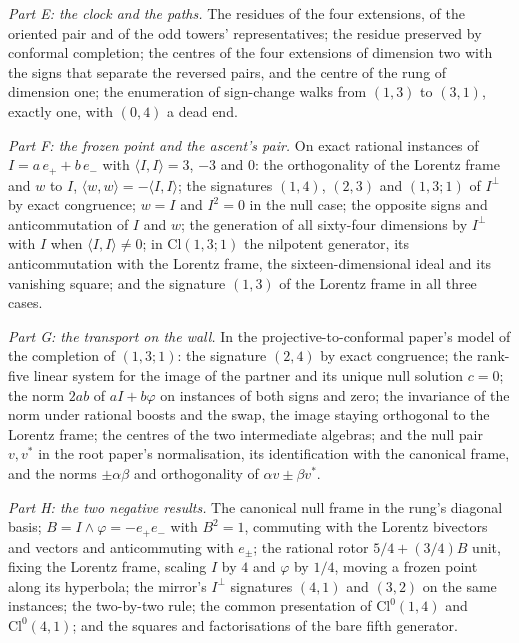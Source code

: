 \documentclass[11pt]{article}
\theoremstyle{definition}
\newcommand{\Cl}{\mathrm{Cl}}
\newcommand{\ip}[2]{\langle #1, #2\rangle}
\begin{document}
\emph{Part E: the clock and the paths.} The residues of the four extensions, of the oriented pair and of the odd towers' representatives; the residue preserved by conformal completion; the centres of the four extensions of dimension two with the signs that separate the reversed pairs, and the centre of the rung of dimension one; the enumeration of sign-change walks from $(1,3)$ to $(3,1)$, exactly one, with $(0,4)$ a dead end.

\emph{Part F: the frozen point and the ascent's pair.} On exact rational instances of $I = a\,e_{+} + b\,e_{-}$ with $\ip{I}{I} = 3$, $-3$ and $0$: the orthogonality of the Lorentz frame and $w$ to $I$, $\ip{w}{w} = -\ip{I}{I}$; the signatures $(1,4)$, $(2,3)$ and $(1,3;1)$ of $I^{\perp}$ by exact congruence; $w = I$ and $I^{2} = 0$ in the null case; the opposite signs and anticommutation of $I$ and $w$; the generation of all sixty-four dimensions by $I^{\perp}$ with $I$ when $\ip{I}{I} \neq 0$; in $\Cl(1,3;1)$ the nilpotent generator, its anticommutation with the Lorentz frame, the sixteen-dimensional ideal and its vanishing square; and the signature $(1,3)$ of the Lorentz frame in all three cases.

\emph{Part G: the transport on the wall.} In the projective-to-conformal paper's model of the completion of $(1,3;1)$: the signature $(2,4)$ by exact congruence; the rank-five linear system for the image of the partner and its unique null solution $c = 0$; the norm $2ab$ of $aI + b\varphi$ on instances of both signs and zero; the invariance of the norm under rational boosts and the swap, the image staying orthogonal to the Lorentz frame; the centres of the two intermediate algebras; and the null pair $v, v^{*}$ in the root paper's normalisation, its identification with the canonical frame, and the norms $\pm\alpha\beta$ and orthogonality of $\alpha v \pm \beta v^{*}$.

\emph{Part H: the two negative results.} The canonical null frame in the rung's diagonal basis; $B = I \wedge \varphi = -e_{+}e_{-}$ with $B^{2} = 1$, commuting with the Lorentz bivectors and vectors and anticommuting with $e_{\pm}$; the rational rotor $5/4 + (3/4)B$ unit, fixing the Lorentz frame, scaling $I$ by $4$ and $\varphi$ by $1/4$, moving a frozen point along its hyperbola; the mirror's $I^{\perp}$ signatures $(4,1)$ and $(3,2)$ on the same instances; the two-by-two rule; the common presentation of $\Cl^{0}(1,4)$ and $\Cl^{0}(4,1)$; and the squares and factorisations of the bare fifth generator.
\end{document}
